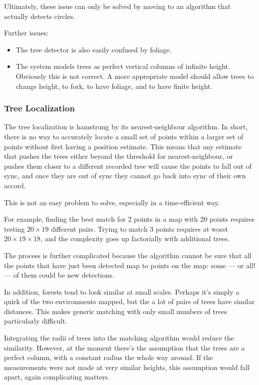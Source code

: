 \documentclass[12pt,oneside,a4paper]{book}
\begin{document}
Ultimately, these issue can only be solved by moving to an algorithm
that actually detects circles.

Further issues:
\begin{itemize}
\item The tree detector is also easily confused by foliage.
\item The system models trees as perfect vertical columns of infinite
  height. Obviously this is not correct. A more appropriate model
  should allow trees to change height, to fork, to have foliage, and
  to have finite height.
\end{itemize}

\subsubsection{Tree Localization}
\label{sec:tree-localization}

The tree localization is hamstrung by its
nearest-neighbour algorithm. In short, there is no way to accurately
locate a small set of points within a larger set of points without
first having a position estimate. This means that any estimate that
pushes the trees either beyond the threshold for nearest-neighbour, or
pushes them closer to a different recorded tree will cause the points
to fall out of sync, and once they are out of sync they cannot go back
into sync of their own accord.

This is not an easy problem to solve, especially in a time-efficient
way. 

For example, finding the best match for 2 points in a map with 20
points requires testing $20 \times 19$ different pairs. Trying to
match 3 points requires at worst $20 \times 19 \times 18$, and the
complexity goes up factorially with additional trees. 

The process is further complicated because the algorithm cannot be
sure that all the points that have just been detected map to points on
the map: some --- or all! --- of them could be new detections.

In addition, forests tend to look similar at small scales. Perhaps
it's simply a quirk of the two environments mapped, but the a lot of
pairs of trees have similar distances. This makes generic matching
with only small numbers of trees particularly difficult.

Integrating the radii of trees into the matching algorithm would
reduce the similarity. However, at the moment there's the assumption
that the trees are a perfect column, with a constant radius the whole
way around. If the measurements were not made at very similar heights,
this assumption would fall apart, again complicating matters.
\end{document}
